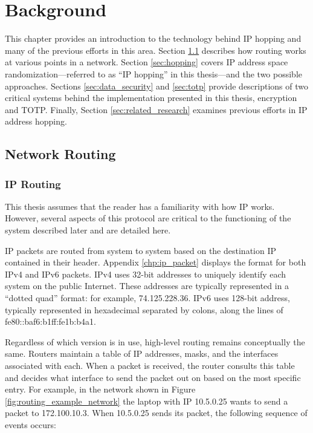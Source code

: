 \chapter{Background}
\label{chp:background}
\par This chapter provides an introduction to the technology behind \ac{IP} hopping and many of the previous efforts in this area. Section \ref{sec:routing} describes how routing works at various points in a network. Section \ref{sec:hopping} covers IP address space randomization---referred to as ``\ac{IP} hopping'' in this thesis---and the two possible approaches. Sections \ref{sec:data_security} and \ref{sec:totp} provide descriptions of two critical systems behind the implementation presented in this thesis, encryption and \ac{TOTP}. Finally, Section \ref{sec:related_research} examines previous efforts in \ac{IP} address hopping.

\section{Network Routing}
\label{sec:routing}

\subsection{\ac{IP} Routing}
\label{sec:ip_routing}
\par This thesis assumes that the reader has a familiarity with how \ac{IP} works. However, several aspects of this protocol are critical to the functioning of the system described later and are detailed here. 

\par \ac{IP} packets are routed from system to system based on the destination \ac{IP} contained in their header. Appendix \ref{chp:ip_packet} displays the format for both \ac{IPv4} and \ac{IPv6} packets. \ac{IPv4} uses 32-bit addresses to uniquely identify each system on the public Internet. These addresses are typically represented in a ``dotted quad'' format: for example, 74.125.228.36. \ac{IPv6} uses 128-bit address, typically represented in hexadecimal separated by colons, along the lines of fe80::baf6:b1ff:fe1b:b4a1.

\par Regardless of which version is in use, high-level routing remains conceptually the same. Routers maintain a table of \ac{IP} addresses, masks, and the interfaces associated with each. When a packet is received, the router consults this table and decides what interface to send the packet out on based on the most specific entry. For example, in the network shown in Figure \ref{fig:routing_example_network} the laptop with \ac{IP} 10.5.0.25 wants to send a packet to 172.100.10.3. When 10.5.0.25 sends its packet, the following sequence of events occurs:


